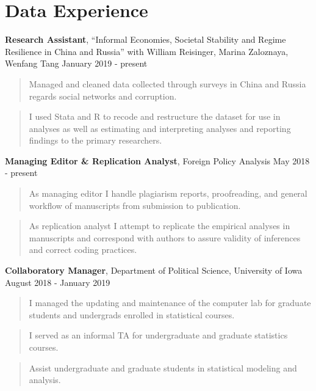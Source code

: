 \documentclass[10pt,]{article}
\begin{document}
\section{Data Experience}\label{data-experience}

\textbf{Research Assistant}, ``Informal Economies, Societal Stability
and Regime Resilience in China and Russia'' with William Reisinger,
Marina Zaloznaya, Wenfang Tang \hfill January 2019 - present

\begin{quote}
Managed and cleaned data collected through surveys in China and Russia
regards social networks and corruption.
\end{quote}

\begin{quote}
I used Stata and R to recode and restructure the dataset for use in
analyses as well as estimating and interpreting analyses and reporting
findings to the primary researchers.
\end{quote}

\textbf{Managing Editor \& Replication Analyst}, Foreign Policy Analysis
\hfill May 2018 - present

\begin{quote}
As managing editor I handle plagiarism reports, proofreading, and
general workflow of manuscripts from submission to publication.
\end{quote}

\begin{quote}
As replication analyst I attempt to replicate the empirical analyses in
manuscripts and correspond with authors to assure validity of inferences
and correct coding practices.
\end{quote}

\textbf{Collaboratory Manager}, Department of Political Science,
University of Iowa \hfill August 2018 - January 2019

\begin{quote}
I managed the updating and maintenance of the computer lab for graduate
students and undergrads enrolled in statistical courses.
\end{quote}

\begin{quote}
I served as an informal TA for undergraduate and graduate statistics
courses.
\end{quote}

\begin{quote}
Assist undergraduate and graduate students in statistical modeling and
analysis.
\end{quote}
\end{document}
